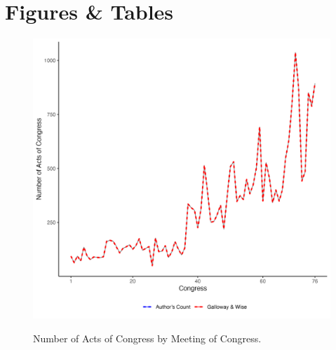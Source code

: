 \documentclass[fleqn,10pt]{wlscirep}
\begin{document}

\section*{Figures \& Tables}


\begin{figure}[h]
  \centering
  \caption{Number of Acts of Congress by Meeting of Congress.}
  \includegraphics[width=\linewidth]{draft/figures/counts_of_laws.png}
    \label{fig:totals}
\end{figure}



\end{document}

